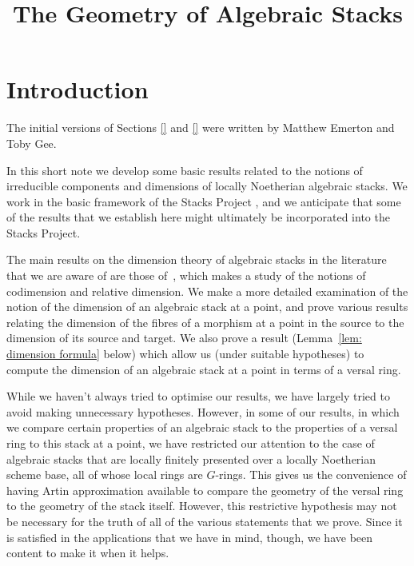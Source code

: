 

%


\title{The Geometry of Algebraic Stacks}


\maketitle

\label{section-phantom}

\tableofcontents

\section{Introduction}
\label{section-introduction}


\noindent
The initial versions of Sections \ref{} and \ref{}
were written by Matthew Emerton and Toby Gee.

\medskip\noindent
In this short note we develop some basic results related to 
the notions of irreducible components and dimensions of locally
Noetherian algebraic stacks.  We work in the basic framework
of the Stacks Project \cite{stacks-project}, and we anticipate that
some of the results that we establish here might ultimately be
incorporated into the Stacks Project.

The main results on the dimension theory of algebraic stacks in the
literature that we are aware of are those of~\cite{MR3351957}, which
makes a study of the notions of codimension and relative dimension. We
make a more detailed examination of the notion of the dimension of an
algebraic stack at a point, and prove various results
relating the dimension of the fibres of a morphism at a point in the source
to the dimension of its source and target.  We also prove a result
(Lemma~\ref{lem: dimension formula} below) which
allow us (under suitable hypotheses) to compute the dimension of
an algebraic stack at a point in terms of a versal ring.

While we haven't always tried to optimise our results, we have 
largely tried to avoid making unnecessary hypotheses.  However, in some
of our results, in which we compare certain properties of an algebraic
stack to the properties of a versal ring to this
stack at a point, we have restricted our attention 
to the case of algebraic stacks that are locally finitely presented 
over a locally Noetherian scheme base, all of whose local rings are
$G$-rings. This gives us the convenience of having Artin approximation
available to compare the geometry of the versal ring to the geometry
of the stack itself.  However, this restrictive hypothesis
may not be necessary for the truth 
of all of the various statements that we prove. 
Since it is satisfied in the applications that we have in mind,
though,
we have been content to make it when it helps.

